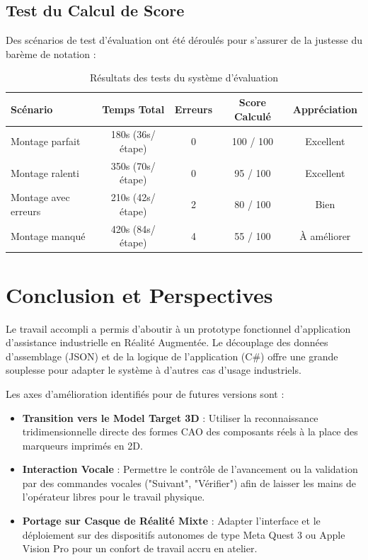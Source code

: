 \documentclass[12pt,a4paper]{article}
\begin{document}
\subsection{Test du Calcul de Score}
Des scénarios de test d'évaluation ont été déroulés pour s'assurer de la justesse du barème de notation :
\begin{table}[H]
    \centering
    \begin{tabular}{|l|c|c|c|c|}
        \hline
        \textbf{Scénario} & \textbf{Temps Total} & \textbf{Erreurs} & \textbf{Score Calculé} & \textbf{Appréciation} \\
        \hline
        Montage parfait & 180s (36s/étape) & 0 & 100 / 100 & Excellent \\
        Montage ralenti & 350s (70s/étape) & 0 & 95 / 100 & Excellent \\
        Montage avec erreurs & 210s (42s/étape) & 2 & 80 / 100 & Bien \\
        Montage manqué & 420s (84s/étape) & 4 & 55 / 100 & À améliorer \\
        \hline
    \end{tabular}
    \caption{Résultats des tests du système d'évaluation}
    \label{tab:scoring_tests}
\end{table}

\section{Conclusion et Perspectives}
Le travail accompli a permis d'aboutir à un prototype fonctionnel d'application d'assistance industrielle en Réalité Augmentée. Le découplage des données d'assemblage (JSON) et de la logique de l'application (C\#) offre une grande souplesse pour adapter le système à d'autres cas d'usage industriels.

Les axes d'amélioration identifiés pour de futures versions sont :
\begin{itemize}
    \item \textbf{Transition vers le Model Target 3D} : Utiliser la reconnaissance tridimensionnelle directe des formes CAO des composants réels à la place des marqueurs imprimés en 2D.
    \item \textbf{Interaction Vocale} : Permettre le contrôle de l'avancement ou la validation par des commandes vocales ("Suivant", "Vérifier") afin de laisser les mains de l'opérateur libres pour le travail physique.
    \item \textbf{Portage sur Casque de Réalité Mixte} : Adapter l'interface et le déploiement sur des dispositifs autonomes de type Meta Quest 3 ou Apple Vision Pro pour un confort de travail accru en atelier.
\end{itemize}
\end{document}
